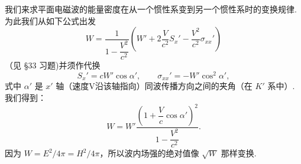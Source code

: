 我们来求平面电磁波的能量密度在从一个惯性系变到另一个惯性系时的变换规律.为此我们从如下公式出发
\begin{equation*}
  W=\frac{1}{1-\dfrac{V^2}{c^2}}
  \left(W'+2\frac{V}{c^2}S_x'-\frac{V^2}{c^2}\sigma_{xx}'\right)
\end{equation*}
（见 §33 习题)并须作代换
\begin{equation*}
  S_x'=cW'\cos\alpha',\qquad
  \sigma_{xx}'=-W'\cos^2\alpha',
\end{equation*}
式中 $\alpha'$ 是 $x'$ 轴（速度V沿该轴指向）同波传播方向之间的夹角（在 $K'$ 系中）.我们得到：
\begin{equation}
  W=W'\frac{\left(1+\dfrac{V}{c}\cos\alpha'\right)^2}{1-\dfrac{V^2}{c^2}}.
\end{equation}
因为 $W = E^2/4\pi = H^2/4\pi$，所以波内场强的绝对值像 $\sqrt{W}$ 那样变换.

